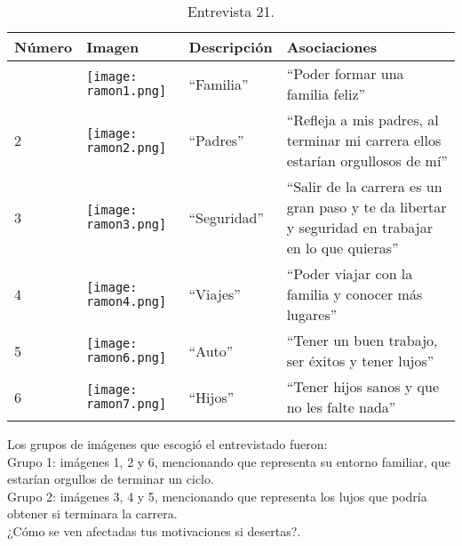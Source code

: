 \begin{table}[H]
	\centering
	\begin{tabular}{>{\centering\arraybackslash}m{1cm} >{\centering\arraybackslash}m{2cm} >{\arraybackslash}m{5cm}>{\arraybackslash}m{5cm}}
		\hline
		Número  & Imagen & Descripción & Asociaciones \\
		\hline \hline
		
		1 & \texttt{[image: ramon1.png]} & ``Familia'' & ``Poder formar una familia feliz'' \\
		\hline
		
		2 & \texttt{[image: ramon2.png]} & ``Padres'' & ``Refleja a mis padres, al terminar mi carrera ellos estarían orgullosos de mí'' \\
		\hline
		
		3 & \texttt{[image: ramon3.png]} & ``Seguridad'' & ``Salir de la carrera es un gran paso y te da libertar y seguridad en trabajar en lo que quieras'' \\
		\hline
		
		4 & \texttt{[image: ramon4.png]} & ``Viajes'' & ``Poder viajar con la familia y conocer más lugares'' \\
		\hline
		
		
		5 & \texttt{[image: ramon6.png]} & ``Auto'' & ``Tener un buen trabajo, ser éxitos y tener lujos'' \\
		\hline
		
		6 & \texttt{[image: ramon7.png]} & ``Hijos'' & ``Tener hijos sanos y que no les falte nada'' \\
		\hline
		
		
	\end{tabular}
	\caption{Entrevista 21.}
	\label{tabla:ramon}
\end{table}

Los grupos de imágenes que escogió el entrevistado fueron:\\

Grupo 1: imágenes 1, 2 y 6, mencionando que representa su entorno familiar, que estarían orgullos de terminar un ciclo. \\

Grupo 2: imágenes 3, 4 y 5, mencionando que representa los lujos que podría obtener si terminara la carrera.\\


¿Cómo se ven afectadas tus motivaciones si desertas?.\\

